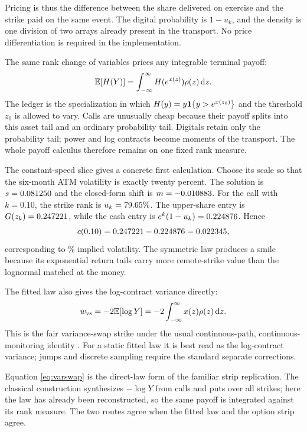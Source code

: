 Pricing is thus the difference between the share delivered on exercise and
the strike paid on the same event.  The digital probability is $1-u_k$, and
the density is one division of two arrays already present in the transport.
No price differentiation is required in the implementation.

The same rank change of variables prices any integrable terminal payoff:
\begin{equation}
\mathbb{E}[H(Y)]=\int_{-\infty}^{\infty}H(e^{x(z)})\rho(z)\,\mathrm{d} z.
\label{eq:generalpayoff}
\end{equation}
The ledger is the specialization in which $H(y)=y\mathbf{1}\{y>e^{x(z_0)}\}$ and
the threshold $z_0$ is allowed to vary.  Calls are unusually cheap because
their payoff splits into this asset tail and an ordinary probability tail.
Digitals retain only the probability tail; power and log contracts become
moments of the transport.  The whole payoff calculus therefore remains on one
fixed rank measure.

The constant-speed slice gives a concrete first calculation.  Choose its
scale so that the six-month ATM volatility is exactly twenty percent.  The
solution is $s=0.081250$ and the closed-form shift is $m=-0.010883$.
For the call with $k=0.10$, the strike rank is
$u_k=79.65\%$.  The upper-share entry is
$G(z_k)=0.247221$, while the cash entry is
$e^k(1-u_k)=0.224876$.  Hence
\[
c(0.10)=0.247221-0.224876=0.022345,
\]
corresponding to \MacToyIvOtmPct\% implied volatility.  The symmetric law
produces a smile because its exponential return tails carry more remote-strike
value than the lognormal matched at the money.

The fitted law also gives the log-contract variance directly:
\begin{equation}
w_{\rm vs}=-2\mathbb{E}[\log Y]
=-2\int_{-\infty}^{\infty}x(z)\rho(z)\,\mathrm{d} z.
\label{eq:varswap}
\end{equation}
This is the fair variance-swap strike under the usual continuous-path,
continuous-monitoring identity \citep{Neuberger1994,DemeterfiDermanKamalZou1999}.
For a static fitted law it is best read as the log-contract variance; jumps
and discrete sampling require the standard separate corrections.

Equation \eqref{eq:varswap} is the direct-law form of the familiar strip
replication.  The classical construction synthesizes $-\log Y$ from calls and
puts over all strikes; here the law has already been reconstructed, so the
same payoff is integrated against its rank measure.  The two routes agree
when the fitted law and the option strip agree.

